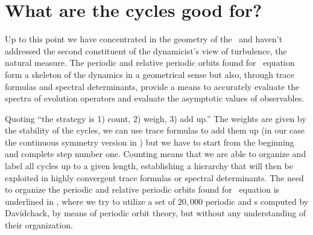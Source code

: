 



\section{What are the cycles good for?}

Up to this point we have concentrated in the geometry of the
\statesp\ and haven't addressed the second constituent of the
dynamicist's view of turbulence, the natural measure. The
periodic and relative periodic orbits found for \KS\ equation
form a skeleton of the dynamics in a geometrical sense but
also, through trace formulas and spectral
determinants, provide a means to accurately
evaluate the spectra of evolution operators and evaluate the
asymptotic values of observables.

Quoting  ``the strategy is 1) count, 2) weigh,
3) add up.'' The weights are given by the stability of the
cycles, we can use trace formulas to add them up (in our case
the continuous symmetry version in ) but we have to
start from the beginning and complete step number one. Counting
means that we are able to organize and label all cycles up to a
given length, establishing a hierarchy that will then be
exploited in highly convergent trace formulas or spectral
determinants. The need to organize the periodic and relative
periodic orbits found for \KS\ equation is underlined in
, where we try to utilize a set 
of $20,000$ periodic and {\rpo s} computed by Davidchack,
by means of periodic orbit theory, but without any understanding
of their organization.


% 
